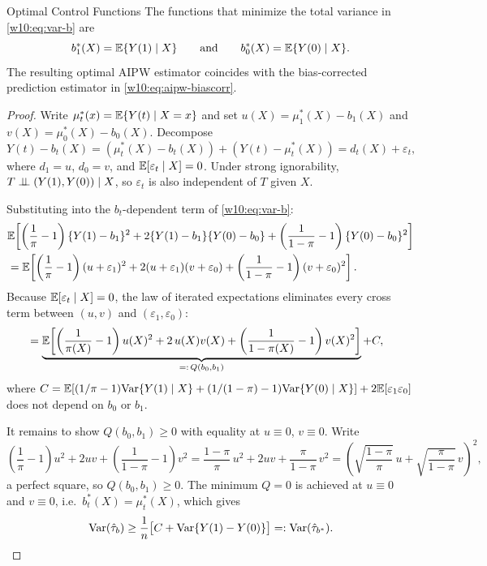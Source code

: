 \documentclass[master.tex]{subfiles}
\begin{document}
\begin{thm}{Optimal Control Functions}
\label{w10:thm:opt-b}
The functions that minimize the total variance in
\eqref{w10:eq:var-b} are
\[
  b_1^*(X) = \mathbb{E}\{Y(1)\mid X\}
  \qquad\text{and}\qquad
  b_0^*(X) = \mathbb{E}\{Y(0)\mid X\}.
\]
The resulting optimal AIPW estimator coincides with the
bias-corrected prediction estimator in \eqref{w10:eq:aipw-biascorr}.
\end{thm}

\begin{proof}
Write $\mu_t^*(x) = \mathbb{E}\{Y(t)\mid X=x\}$ and set
$u(X) = \mu_1^*(X)-b_1(X)$ and $v(X)=\mu_0^*(X)-b_0(X)$.
Decompose
\[
  Y(t) - b_t(X) = (\mu_t^*(X)-b_t(X)) + (Y(t)-\mu_t^*(X))
                = d_t(X) + \varepsilon_t,
\]
where $d_1=u$, $d_0=v$, and $\mathbb{E}[\varepsilon_t\mid X]=0$.
Under strong ignorability, $T\perp\!\!\!\perp (Y(1),Y(0))\mid X$, so
$\varepsilon_t$ is also independent of $T$ given $X$.

Substituting into the $b_t$-dependent term of \eqref{w10:eq:var-b}:
\begin{align*}
  &\mathbb{E}\!\left[
     \left(\frac{1}{\pi}-1\right)\{Y(1)-b_1\}^2
     + 2\{Y(1)-b_1\}\{Y(0)-b_0\}
     + \left(\frac{1}{1-\pi}-1\right)\{Y(0)-b_0\}^2
   \right] \\
  &= \mathbb{E}\!\left[
       \left(\frac{1}{\pi}-1\right)(u+\varepsilon_1)^2
       + 2(u+\varepsilon_1)(v+\varepsilon_0)
       + \left(\frac{1}{1-\pi}-1\right)(v+\varepsilon_0)^2
     \right].
\end{align*}
Because $\mathbb{E}[\varepsilon_t\mid X]=0$, the law of iterated expectations
eliminates every cross term between $(u,v)$ and $(\varepsilon_1,\varepsilon_0)$:
\begin{align}
  &= \underbrace{\mathbb{E}\!\left[
       \left(\frac{1}{\pi(X)}-1\right)u(X)^2
       + 2\,u(X)v(X)
       + \left(\frac{1}{1-\pi(X)}-1\right)v(X)^2
     \right]}_{=:\,Q(b_0,b_1)}
     + C,
  \label{w10:eq:var-decomp}
\end{align}
where $C = \mathbb{E}[(1/\pi-1)\mathrm{Var}\{Y(1)\mid X\}
             +(1/(1-\pi)-1)\mathrm{Var}\{Y(0)\mid X\}]
           + 2\mathbb{E}[\varepsilon_1\varepsilon_0]$
does not depend on $b_0$ or $b_1$.

It remains to show $Q(b_0,b_1)\geq 0$ with equality at
$u\equiv 0$, $v\equiv 0$.  Write
\[
  \left(\frac{1}{\pi}-1\right)u^2+2uv+\left(\frac{1}{1-\pi}-1\right)v^2
  = \frac{1-\pi}{\pi}\,u^2 + 2uv + \frac{\pi}{1-\pi}\,v^2
  = \left(\sqrt{\frac{1-\pi}{\pi}}\,u+\sqrt{\frac{\pi}{1-\pi}}\,v\right)^{\!2},
\]
a perfect square, so $Q(b_0,b_1)\geq 0$.
The minimum $Q=0$ is achieved at $u\equiv 0$ and $v\equiv 0$, i.e.\
$b_t^*(X)=\mu_t^*(X)$, which gives
\[
  \mathrm{Var}(\hat\tau_b)
  \geq \frac{1}{n}\bigl[C + \mathrm{Var}\{Y(1)-Y(0)\}\bigr]
  =: \mathrm{Var}(\hat\tau_{b^*}).  \qedhere
\]
\end{proof}
\end{document}
